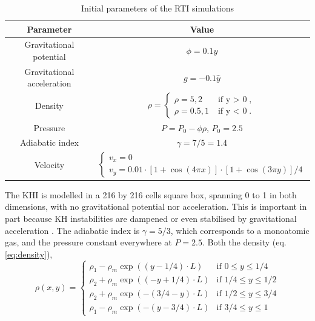 \documentclass[a4paper,12pt]{article}
\begin{document}
\begin{table}[t]
  \centering
  \begin{tabular}{c|c}
    Parameter & Value\\
    \hline
    \hline
    Gravitational potential & $\phi = 0.1y$\\
    Gravitational acceleration & $g = -0.1\hat{y}$\\
    \hline
    Density & $\rho = \begin{cases}\rho = 5, 2 & \textrm{if y $>$ 0},\\
      \rho = 0.5,1 & \textrm{if y $<$ 0}.
    \end{cases}$\\
    Pressure & $P = P_0 - \phi\rho$, $P_0 = 2.5$\\
    Adiabatic index & $\gamma = 7/5 = 1.4$\\
    \hline
    Velocity & $\begin{cases}
      v_x = 0\\
      v_y = 0.01\cdot[1 + \cos(4\pi x)]\cdot[1+\cos(3\pi y)]/4
    \end{cases}$\\
    \hline\hline
  \end{tabular}
  \caption{Initial parameters of the RTI simulations}
  \label{tab:ini_condRTI}
\end{table}

The KHI is modelled in a 216 by 216 cells square box, spanning 0 to 1 in both dimensions, with no gravitational potential nor acceleration. This is important in part because KH instabilities are dampened or even stabilised by gravitational acceleration \parencite{zhou_rayleightaylor_2021}. The adiabatic index is $\gamma = 5/3$, which corresponds to a monoatomic gas, and the pressure constant everywhere at $P=2.5$. Both the density (eq. \ref{eq:density}),
\begin{equation}
  \label{eq:density}
  \rho(x, y) = \begin{cases}
    \rho_1 - \rho_m \exp((y-1/4)\cdot L) & \textrm{if $0 \leq y \leq 1/4$}\\
    \rho_2 + \rho_m \exp((-y+1/4)\cdot L) & \textrm{if $1/4 \leq y \leq 1/2$}\\
    \rho_2 + \rho_m \exp(-(3/4 - y)\cdot L) & \textrm{if $1/2 \leq y \leq 3/4$}\\
    \rho_1 - \rho_m \exp(-(y-3/4)\cdot L) & \textrm{if $3/4 \leq y \leq 1$}
  \end{cases}
\end{equation}
\end{document}
